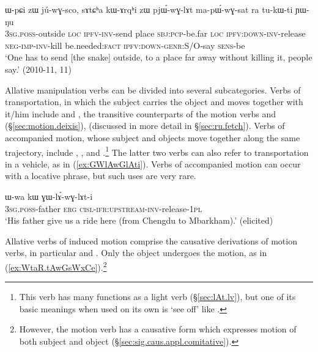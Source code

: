\begin{exe}
\ex \label{ex:WpCi.zW.juwGsco}
\gll  ɯ-pɕi zɯ jú-wɣ-sco, sɤtɕʰa kɯ-ɤrqʰi zɯ pjɯ́-wɣ-lɤt ma-pɯ́-wɣ-sat ra tu-kɯ-ti ɲɯ-ŋu \\
\textsc{3sg}.\textsc{poss}-outside \textsc{loc} \textsc{ipfv}-\textsc{inv}-send place \textsc{sbj}:\textsc{pcp}-be.far \textsc{loc} \textsc{ipfv}:\textsc{down}-\textsc{inv}-release \textsc{neg}-\textsc{imp}-\textsc{inv}-kill be.needed:\textsc{fact} \textsc{ipfv}:\textsc{down}-\textsc{genr}:S/O-say \textsc{sens}-be \\
\glt `One has to send [the snake] outside, to a place far away without killing it, people say.'  (2010-11, 11)
\end{exe} 

Allative manipulation verbs can be divided into several subcategories. Verbs of transportation, in which the subject carries the object and moves together with it/him include  and , the transitive counterparts of the motion verbs  and  (§\ref{sec:motion.deixis}),  (discussed in more detail in §\ref{sec:ru.fetch}). Verbs of accompanied motion, whose subject and objects move together along the same trajectory, include , ,  and .\footnote{This verb has many functions as a light verb (§\ref{sec:lAt.lv}), but one of its basic meanings when used on its own is `see off' like .} The latter two verbs can also refer to transportation in a vehicle, as in (\ref{ex:GWlAwGlAti}). Verbs of accompanied motion can occur with a locative phrase, but such uses are very rare.  

\begin{exe}
\ex \label{ex:GWlAwGlAti}
\gll  ɯ-wa kɯ ɣɯ-lɤ́-wɣ-lɤt-i \\
\textsc{3sg}.\textsc{poss}-father \textsc{erg} \textsc{cisl}-\textsc{ifr}:\textsc{upstream}-\textsc{inv}-release-\textsc{1pl} \\
\glt `His father give us a ride here (from Chengdu to Mbarkham).' (elicited)
\end{exe}

Allative verbs of induced motion comprise the causative derivations of motion verbs, in particular  and . Only the object undergoes the motion, as in (\ref{ex:WtaR.tAwGsWxCe}).\footnote{However, the motion verb  has a causative form  which expresses motion of both subject and object (§\ref{sec:sig.caus.appl.comitative}). }

